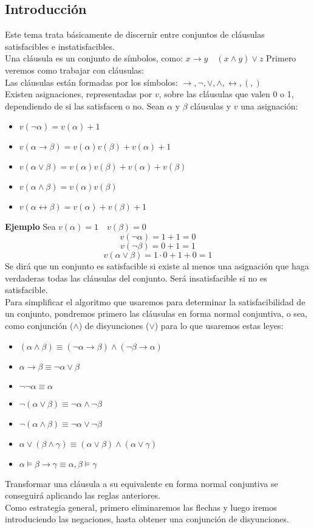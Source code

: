 \documentclass[a4paper]{article}
\theoremstyle{plain} \newtheorem{PrimerPrincipio}{Teorema}
\theoremstyle{plain} \newtheorem{SegundoPrincipio}{Teorema}
\begin{document}
\subsection{Introducción}
Este tema trata básicamente de discernir entre conjuntos de cláusulas satisfacibles e instatisfacibles.\\
Una cláusula es un conjunto de símbolos, como: $x\rightarrow y\quad (x\land y)\lor z$
Primero veremos como trabajar con cláusulas:\\
Las cláusulas están formadas por los símbolos: $\rightarrow, \neg, \lor, \land, \leftrightarrow, (, )$\\
Existen asignaciones, representadas por $v$, sobre las cláusulas que valen 0 o 1, dependiendo de si las satisfacen o no. Sean $\alpha$ y $\beta$ cláusulas y $v$ una asignación:
\begin{itemize}
\item $v(\neg\alpha)=v(\alpha)+1$
\item $v(\alpha\rightarrow\beta)=v(\alpha)v(\beta)+v(\alpha)+1$
\item $v(\alpha\lor\beta)=v(\alpha)v(\beta)+v(\alpha)+v(\beta)$
\item $v(\alpha\land\beta)=v(\alpha)v(\beta)$
\item $v(\alpha\leftrightarrow\beta)=v(\alpha)+v(\beta)+1$
\end{itemize}

\large{\textbf{Ejemplo}}
Sea $v(\alpha)=1 \quad v(\beta)=0$
$$v(\neg\alpha)=1+1=0$$
$$v(\neg\beta)=0+1=1$$
$$v(\alpha\lor\beta)=1\cdot 0 +1+0=1$$
Se dirá que un conjunto es satisfacible si existe al menos una asignación que haga verdaderas todas las cláusulas del conjunto. Será insatisfacible si no es satisfacible.\\
Para simplificar el algoritmo que usaremos para determinar la satisfacibilidad de un conjunto, pondremos primero las cláusulas en forma normal conjuntiva, o sea, como conjunción ($\land$) de disyunciones ($\lor$) para lo que usaremos estas leyes:
\begin{itemize}
\item $(\alpha\land\beta)\equiv(\neg\alpha\rightarrow\beta)\land(\neg\beta\rightarrow\alpha)$
\item $\alpha\rightarrow\beta\equiv\neg\alpha\lor\beta$
\item $\neg\neg\alpha\equiv\alpha$
\item $\neg(\alpha\lor\beta)\equiv\neg\alpha\land\neg\beta$
\item $\neg(\alpha\land\beta)\equiv\neg\alpha\lor\neg\beta$
\item $\alpha\lor(\beta\land\gamma)\equiv(\alpha\lor\beta)\land(\alpha\lor\gamma)$
\item $\alpha\models\beta\rightarrow\gamma\equiv\alpha,\beta\models\gamma$
\end{itemize}
Transformar una cláusula a su equivalente en forma normal conjuntiva se conseguirá aplicando las reglas anteriores.\\
Como estrategia general, primero eliminaremos las flechas y luego iremos introduciendo las negaciones, hasta obtener una conjunción de disyunciones.\\
\end{document}
